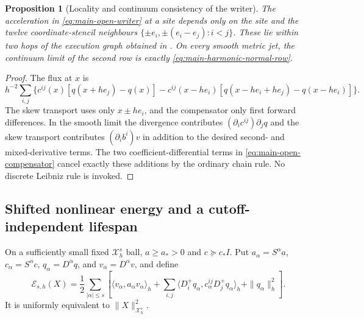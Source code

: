 \documentclass[11pt]{article}
\numberwithin{equation}{section}
\newtheorem{proposition}[proposition]{Proposition}
\theoremstyle{definition}
\theoremstyle{remark}
\begin{document}
\begin{proposition}[Locality and continuum consistency of the writer]
\label{prop:supp-open-locality}
The acceleration in \eqref{eq:main-open-writer} at a site depends only on the
site and the twelve coordinate-stencil neighbours
$\{\pm e_i,\pm(e_i-e_j):i<j\}$.  These lie within two hops of the execution
graph obtained in .  On every smooth metric jet,
the continuum limit of the second row is exactly
\eqref{eq:main-harmonic-normal-row}.
\end{proposition}
\begin{proof}
The flux at $x$ is
\[
 h^{-2}\sum_{i,j}\{c^{ij}(x)[q(x+he_j)-q(x)]
 -c^{ij}(x-he_i)[q(x-he_i+he_j)-q(x-he_i)]\}.
\]
The skew transport uses only $x\pm he_i$, and the compensator only first
forward differences.  In the smooth limit the divergence contributes
$(\partial_ic^{ij})\partial_jq$ and the skew transport contributes
$(\partial_ib^i)v$ in addition to the desired second- and mixed-derivative
terms.  The two coefficient-differential terms in
\eqref{eq:main-open-compensator} cancel exactly these additions by the
ordinary chain rule.  No discrete Leibniz rule is invoked.
\end{proof}

\subsection{Shifted nonlinear energy and a cutoff-independent lifespan}

On a sufficiently small fixed $\mathcal X_h^s$ ball, $a\ge a_*>0$ and
$c\succeq c_*I$.  Put
$a_\alpha=S^\alpha a$, $c_\alpha=S^\alpha c$,
$q_\alpha=D^\alpha q$, and $v_\alpha=D^\alpha v$, and define
\begin{equation}
 \mathscr E_{s,h}(X)=\frac12\sum_{|\alpha|\le s}
 \left[\langle v_\alpha,a_\alpha v_\alpha\rangle_h
 +\sum_{i,j}\langle D_i^+q_\alpha,c_\alpha^{ij}D_j^+q_\alpha\rangle_h
 +\|q_\alpha\|_h^2\right].
 \label{eq:supp-open-energy}
\end{equation}
It is uniformly equivalent to $\|X\|_{\mathcal X_h^s}^2$.
\end{document}
